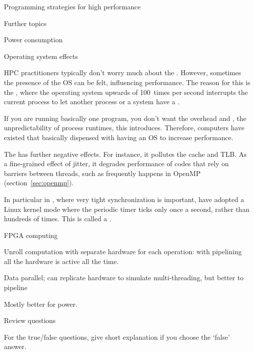  {Programming strategies for high performance}
\label{sec:performance-programming}


 {Further topics}

 {Power consumption}
\label{sec:power}


 {Operating system effects}

HPC practitioners typically don't worry much about the
. However, sometimes the presence of the \ac{OS} can be
felt, influencing performance. The reason for this is the
, where the operating system upwards
of 100~times per second interrupts the current process to let another
process or a system  have a .

If you are running basically one program, you don't want the overhead and
, the unpredictability of process
runtimes, this introduces. Therefore, computers have existed that basically dispensed
with having an \ac{OS} to increase performance.

The  has further negative
effects. For instance, it pollutes the cache and
\ac{TLB}. As a fine-grained effect of jitter, it degrades performance
of codes that rely on barriers between threads, such as frequently
happens in OpenMP (section~\ref{sec:openmp}).

In particular in , where very tight
synchronization is important, have adopted a Linux kernel mode where
the periodic timer ticks only once a second, rather than hundreds of
times. This is called a .

\begin{notready}
 {FPGA computing}

Unroll computation with separate hardware for each operation:
with pipelining all the hardware is active all the time.

Data parallel; can replicate hardware to simulate multi-threading, but
better to pipeline

Mostly better for power.
\end{notready}

 {Review questions}

For the true/false questions, give short explanation if you choose the `false' answer.

